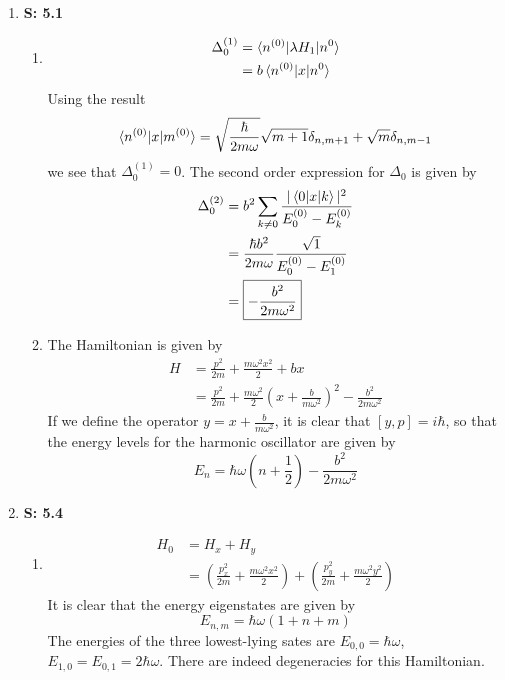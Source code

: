 \documentclass[12pt, letterpaper]{article}
\begin{document}
\begin{enumerate}

    \item[] \textbf{S: 5.1}
    \begin{enumerate}
\item 
\begin{align}
    \Delta_0^{(1)}&=\braket{n^{(0)}|\lambda H_1|n^{0}}\\&=b\braket{n^{(0)}|x|n^{0}}
\end{align}
Using the result
\begin{equation}
    \braket{n^{(0)}|x|m^{(0)}}=\sqrt{\frac{\hbar}{2m\omega}}\sqrt{m+1}\delta_{n,m+1}+\sqrt{m}\delta_{n,m-1}
\end{equation}
we see that $\Delta_0^{(1)}=0$. The second order expression for $\Delta_{0}$ is given by
\begin{align}
    \Delta_0^{(2)}&=b^2\sum_{k\neq 0}\frac{|\braket{0|x|k}|^2}{E_0^{(0)}-E_k^{(0)}}\\&=\frac{\hbar b^2}{2m\omega}\frac{\sqrt{1}}{E_0^{(0)}-E_1^{(0)}}\\&=\boxed{-\frac{b^2}{2m\omega^2}}
\end{align}
\item 
The Hamiltonian is given by
\begin{align}
    H&=\frac{p^2}{2m}+\frac{m\omega^2x^2}{2}+bx\\&=\frac{p^2}{2m}+\frac{m\omega^2}{2}\left(x+\frac{b}{m\omega^2}\right)^2-\frac{b^2}{2m\omega^2}
\end{align}
If we define the operator $y=x+\frac{b}{m\omega^2}$, it is clear that $[y,p]=i\hbar$, so that the energy levels for the harmonic oscillator are given by
\begin{equation}
    E_n=\hbar\omega\left(n+\frac{1}{2}\right)-\frac{b^2}{2m\omega^2}
\end{equation}
\end{enumerate}


    \item[] \textbf{S: 5.4}
    \begin{enumerate}
\item 
\begin{align}
    H_0&=H_x+H_y\\&=\left(\frac{p_x^2}{2m}+\frac{m\omega^2x^2}{2}\right)+\left(\frac{p_y^2}{2m}+\frac{m\omega^2y^2}{2}\right)
\end{align}
It is clear that the energy eigenstates are given by
\begin{equation}
    E_{n,m}=\hbar\omega\left(1+n+m\right)
\end{equation}
The energies of the three lowest-lying sates are $E_{0,0}=\hbar \omega$, $E_{1,0}=E_{0,1}=2\hbar\omega$. There are indeed degeneracies for this Hamiltonian.


\end{enumerate}
\end{enumerate}
\end{document}
